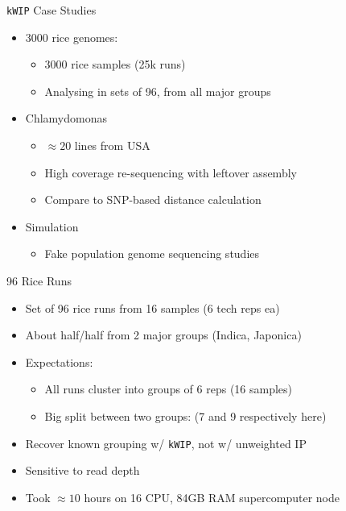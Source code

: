 \documentclass[t]{beamer}
\begin{document}
\begin{frame}{\texttt{kWIP} Case Studies}
  \begin{itemize}
    \item 3000 rice genomes:
      \begin{itemize}
        \item 3000 rice samples (25k runs)
          \autocite{the_3000_rice_genomes_project_3000_2014}
        \item Analysing in sets of 96, from all major groups
      \end{itemize}
    \item Chlamydomonas
      \begin{itemize}
        \item $\approx 20$ lines from USA
        \item High coverage re-sequencing with leftover assembly
        \item Compare to SNP-based distance calculation
      \end{itemize}
    \item Simulation
      \begin{itemize}
        \item Fake population genome sequencing studies
      \end{itemize}
  \end{itemize}
\end{frame}

\begin{frame}{96 Rice Runs}
  \begin{itemize}
    \item Set of 96 rice runs from 16 samples (6 tech reps ea)
    \item About half/half from 2 major groups (Indica, Japonica)
    \item Expectations:
      \begin{itemize}
        \item All runs cluster into groups of 6 reps (16 samples)
        \item Big split between two groups: (7 and 9 respectively here)
      \end{itemize}
    \item Recover known grouping w/ \texttt{kWIP}, not w/ unweighted IP
    \item Sensitive to read depth
    \item Took $\approx 10$ hours on 16 CPU, 84GB RAM supercomputer node
  \end{itemize}
\end{frame}
\end{document}
